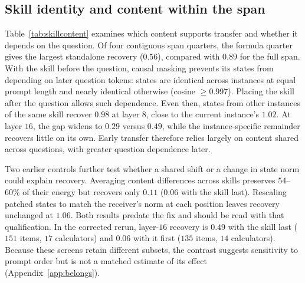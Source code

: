 \documentclass{article}
\begin{document}
\subsection{Skill identity and content within the span}
\label{sec:whose}

Table~\ref{tab:skillcontent} examines which content supports transfer and
whether it depends on the question. Of four contiguous span quarters, the
formula quarter gives the largest standalone recovery ($0.56$), compared with
$0.89$ for the full span. With the skill before the question, causal masking
prevents its states from depending on later question tokens: states are
identical across instances at equal prompt length and nearly identical
otherwise (cosine $\ge0.997$). Placing the skill after the question allows
such dependence. Even then, states from other instances of the same skill
recover $0.98$ at layer $8$, close to the current instance's $1.02$. At layer
$16$, the gap widens to $0.29$ versus $0.49$, while the instance-specific
remainder recovers little on its own. Early transfer therefore relies largely
on content shared across questions, with greater question dependence later.

\begin{table}[t]
\caption{Content and question dependence of span states, Qwen3-8B after the fix.
Top: each contiguous quarter is injected separately, on $135$ items from $14$
calculators. Bottom: with the skill after the question, content shared across
other instances and the instance-specific remainder are injected separately,
on $151$ items from $17$ calculators. Each comparison uses its screened subset
from the larger rerun. All entries report recovery $\rho$.}
\label{tab:skillcontent}
\centering\small

\end{table}

Two earlier controls further test whether a shared shift or a change in state
norm could explain recovery. Averaging content differences across skills
preserves $54$--$60\%$ of their energy but recovers only $0.11$ ($0.06$ with
the skill last). Rescaling patched states to match the receiver's norm at each
position leaves recovery unchanged at $1.06$. Both results predate the fix
and should be read with that qualification. In the corrected rerun, layer-$16$
recovery is $0.49$ with the skill last ($151$ items, $17$ calculators) and
$0.06$ with it first ($135$ items, $14$ calculators). Because these screens
retain different subsets, the contrast suggests sensitivity to prompt order
but is not a matched estimate of its effect (Appendix~\ref{app:belongs}).
\end{document}
